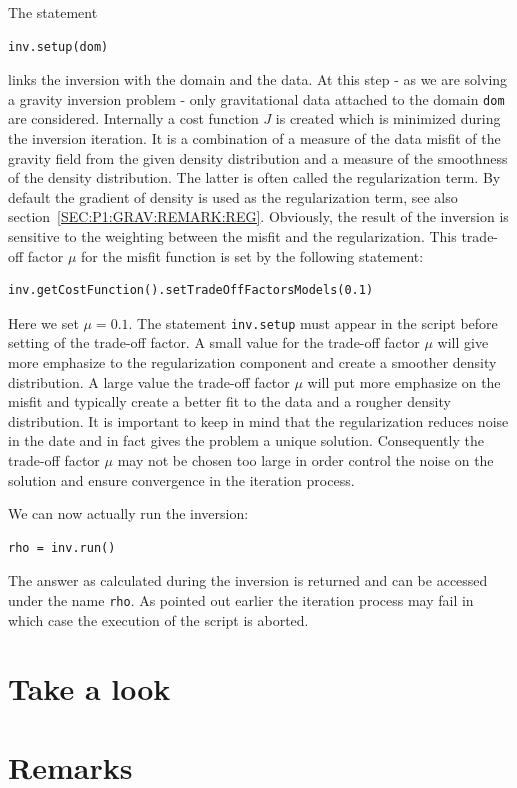 The statement 
\begin{verbatim}
inv.setup(dom)
\end{verbatim}
links the inversion with the domain and the data. At this step - as we are solving a gravity inversion problem -
only gravitational data attached to the domain \verb|dom| are considered. Internally a cost function $J$
is created which is minimized during the inversion iteration. It is a combination of
a measure of the data misfit of the gravity field from the given density distribution and 
a measure of the smoothness of the density distribution. The latter is often called the regularization term. By default 
the gradient of density is used as the regularization term, see also section~\ref{SEC:P1:GRAV:REMARK:REG}. 
Obviously, the result of the inversion is sensitive to the weighting between the misfit and the regularization. This
trade-off factor $\mu$ for the misfit function is set by the following statement:
\begin{verbatim}
inv.getCostFunction().setTradeOffFactorsModels(0.1) 
\end{verbatim}
Here we set $\mu=0.1$. The statement \verb|inv.setup| must appear in the script before setting of the trade-off factor.
A small value for the trade-off factor $\mu$ will give more emphasize to the regularization component 
and create a smoother density distribution. A large value the trade-off factor $\mu$ will put more emphasize on the
misfit and typically create a better fit to the data and a rougher density distribution. It is important to keep in mind that
the regularization reduces noise in the date and in fact gives the problem a unique solution. Consequently 
the trade-off factor $\mu$ may not be chosen too large in order control the noise on the solution and ensure convergence in
the iteration process.

We can now actually run the inversion:
\begin{verbatim}
rho = inv.run()
\end{verbatim}
The answer as calculated during the inversion is returned and can be accessed under the name \verb|rho|. As pointed out earlier
the iteration process may fail in which case the execution of the script is aborted. 

\section{Take a look}


\section{Remarks}

